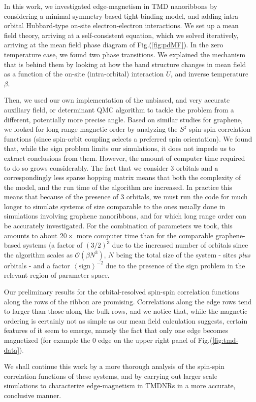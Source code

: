 \label{cap:conclusions}

In this work, we investigated edge-magnetism in \ac{TMD} nanoribbons by considering a minimal symmetry-based tight-binding model, and adding intra-orbital Hubbard-type on-site electron-electron interactions.
We set up a mean field theory, arriving at a self-consistent equation, which we solved iteratively, arriving at the mean field phase diagram of Fig.(\ref{fig:pdMF}).
In the zero temperature case, we found two phase transitions.
We explained the mechanism that is behind them by looking at how the band structure changes in mean field as a function of the on-site (intra-orbital) interaction $U$, and inverse temperature $\beta$.

Then, we used our own implementation of the unbiased, and very accurate auxiliary field, or determinant \ac{QMC} algorithm to tackle the problem from a different, potentially more precise angle.
Based on similar studies for graphene, we looked for long range magnetic order by analyzing the $S^z$ spin-spin correlation functions (since spin-orbit coupling selects a preferred spin orientation).
We found that, while the sign problem limits our simulations, it does not impede us to extract conclusions from them.
However, the amount of computer time required to do so grows considerably.
The fact that we consider 3 orbitals and a correspondingly less sparse hopping matrix means that both the complexity of the model, and the run time of the algorithm are increased.
In practice this means that because of the presence of 3 orbitals, we must run the code for much longer to simulate systems of size comparable to the ones usually done in simulations involving graphene nanoribbons, and for which long range order can be accurately investigated.
For the combination of parameters we took, this amounts to about $20 \times$ more computer time than for the comparable graphene-based systems (a factor of $(3 /2)^3$ due to the increased number of orbitals since the algorithm scales as $\mathcal{O}(\beta N^3)$, $N$ being the total size of the system - sites \emph{plus} orbitals - and a factor $\left\langle \text{sign} \right\rangle^{-2}$ due to the presence of the sign problem in the relevant region of parameter space.

Our preliminary results for the orbital-resolved spin-spin correlation functions along the rows of the ribbon are promising. Correlations along the edge rows tend to larger than those along the bulk rows, and we notice that, while the magnetic ordering is certainly not as simple as our mean field calculation suggests, certain features of it seem to emerge, namely the fact that only one edge becomes magnetized (for example the $0$ edge on the upper right panel of Fig.(\ref{fig:tmd-data}).

We shall continue this work by a more thorough analysis of the spin-spin correlation functions of these systems, and by carrying out larger scale simulations to characterize edge-magnetism in \acp{TMDNR} in a more accurate,  conclusive manner.

\clearpage